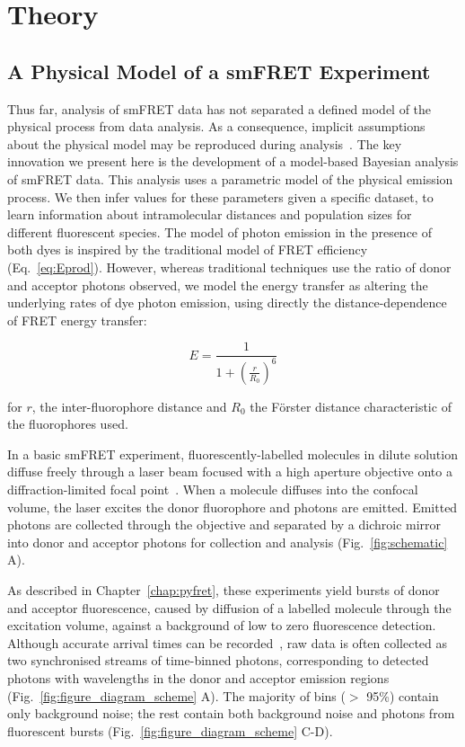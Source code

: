 \clearpage

\section{Theory}
\subsection{A Physical Model of a smFRET Experiment}
\label{subsect:model}
Thus far, analysis of smFRET data has not separated a defined model of the physical process from data analysis. As a consequence, implicit assumptions about the physical model may be reproduced during analysis~\cite{ying00}. The key innovation we present here is the development of a model-based Bayesian analysis of smFRET data. This analysis uses a parametric model of the physical emission process. We then infer values for these parameters given a specific dataset, to learn information about intramolecular distances and population sizes for different fluorescent species. The model of photon emission in the presence of both dyes is inspired by the traditional model of FRET efficiency (Eq.~\ref{eq:Eprod}). However, whereas traditional techniques use the ratio of donor and acceptor photons observed, we model the energy transfer as altering the underlying rates of dye photon emission, using directly the distance-dependence of FRET energy transfer:

\begin{equation}
E = \frac{1}{1+ (\frac{r}{R_0})^6}
\label{eq:FRET_dist}
\end{equation}

for $r$, the inter-fluorophore distance and $R_0$ the F\"orster distance characteristic of the fluorophores used.

In a basic smFRET experiment, fluorescently-labelled molecules in dilute solution diffuse freely through a laser beam focused with a high aperture objective onto a diffraction-limited focal point~\cite{schuler05}.  When a molecule diffuses into the confocal volume, the laser excites the donor fluorophore and photons are emitted.  Emitted photons are collected through the objective and separated by a dichroic mirror into donor and acceptor photons for collection and analysis (Fig.~\ref{fig:schematic} A).

As described in Chapter~\ref{chap:pyfret}, these experiments yield bursts of donor and acceptor fluorescence, caused by diffusion of a labelled molecule through the excitation volume, against a background of low to zero fluorescence detection.  Although accurate arrival times can be recorded~\cite{chung09}, raw data is often collected as two synchronised streams of time-binned photons, corresponding to detected photons with wavelengths in the donor and acceptor emission regions (Fig.~\ref{fig:figure_diagram_scheme} A).  The majority of bins ($>$ 95\%) contain only background noise; the rest contain both background noise and photons from fluorescent bursts (Fig.~\ref{fig:figure_diagram_scheme} C-D).

